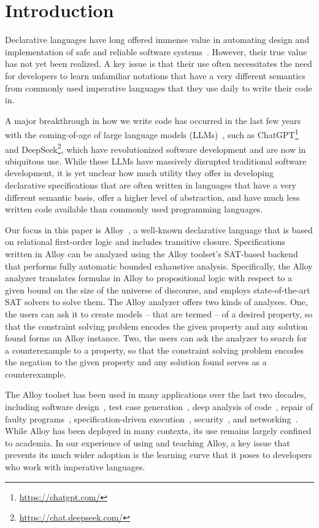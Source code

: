 \section{Introduction}
\label{sec:intro}

Declarative languages have long offered immense value in automating
design and implementation of safe and reliable software
systems~\cite{Nugues2006,Ceri1989,Leavens1998,JacksonAlloy2002,Jones1990,Guttag2012}.
However, their true value has not yet been realized.  A key issue is
that their use often necessitates the need for developers to learn
unfamiliar notations that have a very different semantics from
commonly used imperative languages that they use daily to write their
code in.

A major breakthrough in how we write code has occurred in the last few
years with the coming-of-age of large language models
(LLMs)~\cite{ZhaoETALLLMSurvey2024}, such as
ChatGPT\footnote{\url{https://chatgpt.com/}} and
DeepSeek\footnote{\url{https://chat.deepseek.com/}}, which have
revolutionized software development and are now in ubiquitous use.
While these LLMs have massively disrupted traditional software
development, it is yet unclear how much utility they offer in
developing declarative specifications that are often written in
languages that have a very different semantic basis, offer a higher
level of abstraction, and have much less written code available than
commonly used programming languages.

Our focus in this paper is Alloy~\cite{JacksonAlloy2002}, a well-known
declarative language that is based on relational first-order logic and
includes transitive closure.  Specifications written in Alloy can be
analyzed using the Alloy toolset's SAT-based backend that performs
fully automatic bounded exhaustive analysis.  Specifically, the Alloy
analyzer translates formulas in Alloy to propositional logic with
respect to a given bound on the size of the universe of discourse, and
employs state-of-the-art SAT solvers to solve them.  The Alloy
analyzer offers two kinds of analyses.  One, the users can ask it to
create models -- that are termed  -- of a desired
property, so that the constraint solving problem encodes the given
property and any solution found forms an Alloy instance.  Two, the
users can ask the analyzer to search for a counterexample to a
property, so that the constraint solving problem encodes the negation
to the given property and any solution found serves as a
counterexample.

The Alloy toolset has been used in many applications over the last two
decades, including software design~\cite{CD2Alloy,CDDiff}, test case
generation~\cite{MarinovKhurshidASE2001}, deep analysis of
code~\cite{JacksonVaziriISSTA2000}, repair of faulty
programs~\cite{GopinathETALTACAS2011}, specification-driven
execution~\cite{Samimi2010,Zaeem2010,Squander},
security~\cite{Maldonado-Lopez2014,Margrave}, and
networking~\cite{OpenflowAlloy}.  While Alloy has been deployed in
many contexts, its use remains largely confined to academia.  In our
experience of using and teaching Alloy, a key issue that prevents its
much wider adoption is the learning curve that it poses to developers
who work with imperative languages.

